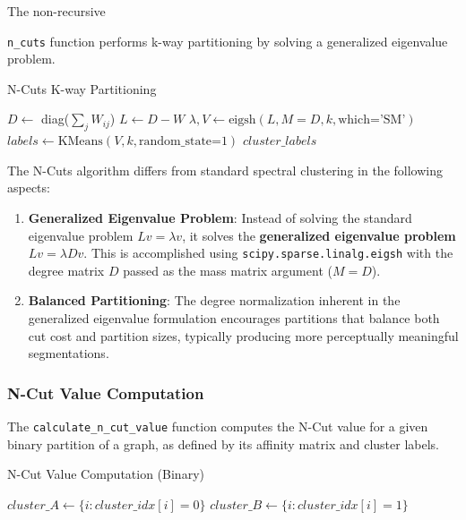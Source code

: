 \documentclass[12pt,a4paper]{article}
\begin{document}
The non-recursive {\texttt{n\_cuts} function performs k-way partitioning by solving a generalized eigenvalue problem.

\begin{algorithm}[H]
    \caption{N-Cuts K-way Partitioning}
    \begin{algorithmic}[1]
            \State $D \gets$ diag($\sum_{j} W_{ij}$) 
            \State $L \gets D - W$ 
            \State $\lambda, V \gets \text{eigsh}(L, M=D, k, \text{which='SM'})$ 
            \State $labels \gets \text{KMeans}(V, k, \text{random\_state=1})$ 
            \State \Return $cluster\_labels$
        \EndFunction
    \end{algorithmic}
\end{algorithm}

The N-Cuts algorithm differs from standard spectral clustering in the following aspects:

\begin{enumerate}
    \item \textbf{Generalized Eigenvalue Problem}: Instead of solving the standard eigenvalue problem $Lv = \lambda v$, it solves the \textbf{generalized eigenvalue problem} $Lv = \lambda Dv$. This is accomplished using \texttt{scipy.sparse.linalg.eigsh} with the degree matrix $D$ passed as the mass matrix argument ($M=D$).
        
    \item \textbf{Balanced Partitioning}: The degree normalization inherent in the generalized eigenvalue formulation encourages partitions that balance both cut cost and partition sizes, typically producing more perceptually meaningful segmentations.    
\end{enumerate}

\subsubsection{N-Cut Value Computation}
\label{subsec:ncuts_value_impl}

The {\texttt{calculate\_n\_cut\_value}} function computes the N-Cut value for a given binary partition of a graph, as defined by its affinity matrix and cluster labels.

\begin{algorithm}[H]
\caption{N-Cut Value Computation (Binary)}
\begin{algorithmic}[1]
        \State $cluster\_A \gets \{i : cluster\_idx[i] = 0\}$
        \State $cluster\_B \gets \{i : cluster\_idx[i] = 1\}$
        

\end{algorithmic}
\end{algorithm}}
\end{document}

